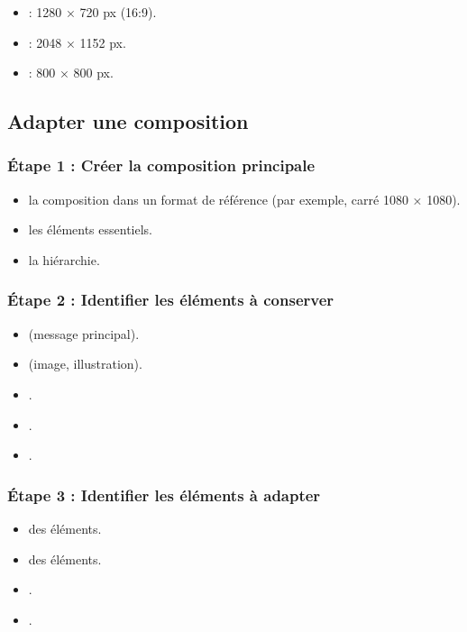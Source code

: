 \begin{itemize}
    \item {} : 1280 × 720 px (16:9).
    \item {} : 2048 × 1152 px.
    \item {} : 800 × 800 px.
\end{itemize}

\subsection{Adapter une composition}

\subsubsection{Étape 1 : Créer la composition principale}

\begin{itemize}
    \item {} la composition dans un format de référence (par exemple, carré 1080 × 1080).
    \item {} les éléments essentiels.
    \item {} la hiérarchie.
\end{itemize}

\subsubsection{Étape 2 : Identifier les éléments à conserver}

\begin{itemize}
    \item {} (message principal).
    \item {} (image, illustration).
    \item {}.
    \item {}.
    \item {}.
\end{itemize}

\subsubsection{Étape 3 : Identifier les éléments à adapter}

\begin{itemize}
    \item {} des éléments.
    \item {} des éléments.
    \item {}.
    \item {}.
\end{itemize}

